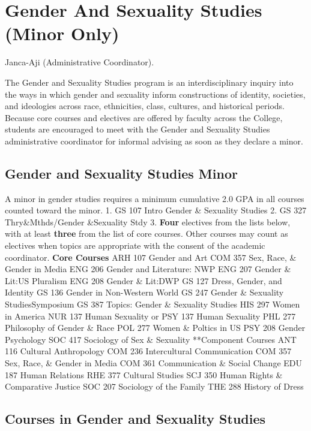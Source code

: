 \documentclass[
  letterpaper,
]{scrbook}
\begin{document}
\section{Gender And Sexuality Studies (Minor
Only)}\label{sec-gender-and-sexuality-studies}

Janca-Aji (Administrative Coordinator).

The Gender and Sexuality Studies program is an interdisciplinary inquiry
into the ways in which gender and sexuality inform constructions of
identity, societies, and ideologies across race, ethnicities, class,
cultures, and historical periods. Because core courses and electives are
offered by faculty across the College, students are encouraged to meet
with the Gender and Sexuality Studies administrative coordinator for
informal advising as soon as they declare a minor.

\subsection{Gender and Sexuality Studies
Minor}\label{gender-and-sexuality-studies-minor}

A minor in gender studies requires a minimum cumulative 2.0 GPA in all
courses counted toward the minor. 1. GS 107 Intro Gender \& Sexuality
Studies 2. GS 327 Thry\&Mthds/Gender \&Sexuality Stdy 3. \textbf{Four}
electives from the lists below, with at least \textbf{three} from the
list of core courses. Other courses may count as electives when topics
are appropriate with the consent of the academic coordinator.
\textbf{Core Courses} ARH 107 Gender and Art COM 357 Sex, Race, \&
Gender in Media ENG 206 Gender and Literature: NWP ENG 207 Gender \&
Lit:US Pluralism ENG 208 Gender \& Lit:DWP GS 127 Dress, Gender, and
Identity GS 136 Gender in Non-Western World GS 247 Gender \& Sexuality
StudiesSymposium GS 387 Topics: Gender \& Sexuality Studies HIS 297
Women in America NUR 137 Human Sexuality or PSY 137 Human Sexuality PHL
277 Philosophy of Gender \& Race POL 277 Women \& Poltics in US PSY 208
Gender Psychology SOC 417 Sociology of Sex \& Sexuality **Component
Courses ANT 116 Cultural Anthropology COM 236 Intercultural
Communication COM 357 Sex, Race, \& Gender in Media COM 361
Communication \& Social Change EDU 187 Human Relations RHE 377 Cultural
Studies SCJ 350 Human Rights \& Comparative Justice SOC 207 Sociology of
the Family THE 288 History of Dress

\subsection{Courses in Gender and Sexuality
Studies}\label{courses-in-gender-and-sexuality-studies}
\end{document}
